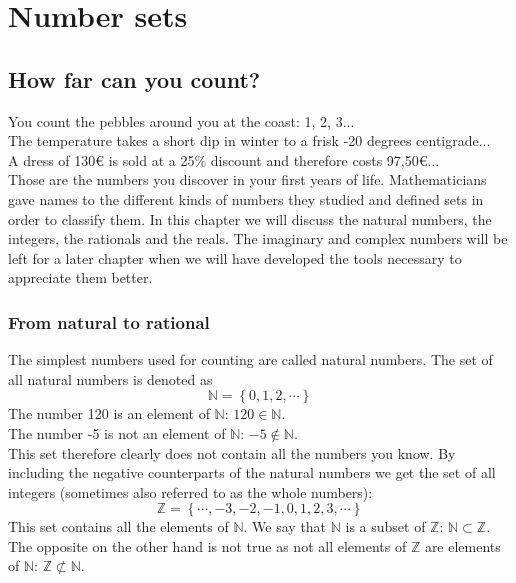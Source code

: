 \chapter{Number sets}
\label{Set_Theory}

\section{How far can you count?}

\noindent You count the pebbles around you at the coast: 1, 2, 3...\\
The temperature takes a short dip in winter to a frisk -20 degrees centigrade...\\
A dress of 130€ is sold at a 25\% discount and therefore costs 97,50€... \\

\noindent Those are the numbers you discover in your first years of life. Mathematicians gave names to the different kinds of numbers they studied and defined sets in order to classify them. In this chapter we will discuss the natural numbers, the integers, the rationals and the reals. The imaginary and complex numbers will be left for a later chapter when we will have developed the tools necessary to appreciate them better.

\subsection{From natural to rational}
\noindent The simplest numbers used for counting are called natural numbers. The set of all natural numbers is denoted as
\begin{equation}
	\mathbb{N} = \left\{ 0, 1, 2, \cdots \right\}
\end{equation}
The number 120 is an element of $\mathbb{N}$: $ 120 \in \mathbb{N}$.\\
The number -5 is not an element of $\mathbb{N}$: $ -5 \notin \mathbb{N}$.\\

\noindent This set therefore clearly does not contain all the numbers you know. By including the negative counterparts of the natural numbers we get the set of all integers (sometimes also referred to as the whole numbers):
\begin{equation}
	\mathbb{Z} = \left\{\cdots,-3, -2, -1, 0, 1, 2, 3, \cdots \right\}
\end{equation}
This set contains all the elements of $\mathbb{N}$. We say that $\mathbb{N}$ is a subset of $\mathbb{Z}$: $\mathbb{N} \subset \mathbb{Z}$.\\ The opposite on the other hand is not true as not all elements of $\mathbb{Z}$ are elements of $\mathbb{N}$: $\mathbb{Z} \not\subset \mathbb{N}$. \\

